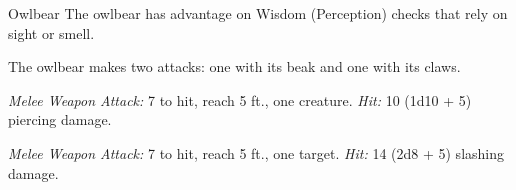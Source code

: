 \documentclass[10pt,a4paper,twoside,bg=print,twocolumn,openany,nodeprecatedcode]{dndbook}
\begin{document}
\begin{DndMonster}[float=t]{Owlbear}
\DndMonsterBasics[
armor-class = {13 (natural armor)},
hit-points = {\DndDice{7d10 + 21}},
speed = {40 ft.}
]
\DndMonsterAbilityScores[
 str = 20,
 dex = 12,
 con = 17,
 int = 3,
 wis = 12,
 cha = 7
]
\DndMonsterDetails[
skills = {Perception +3},
senses = {darkvision 60 ft., passive perception 13},
challenge = 3,
]
The owlbear has advantage on Wisdom (Perception) checks that rely on sight or smell.

The owlbear makes two attacks: one with its beak and one with its claws.

\textsl{Melee Weapon Attack:} 7 to hit, reach 5 ft., one creature. \textsl{Hit:} 10 (1d10 + 5) piercing damage.

\textsl{Melee Weapon Attack:} 7 to hit, reach 5 ft., one target. \textsl{Hit:} 14 (2d8 + 5) slashing damage.

\end{DndMonster}


\clearpage
\end{document}
